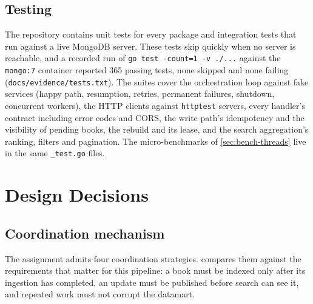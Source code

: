 \documentclass[10pt,a4paper]{article}
\newcommand{\code}[1]{\texttt{#1}}
\begin{document}
\subsection{Testing}
\label{sec:testing}

The repository contains unit tests for every package and integration tests that
run against a live MongoDB server. These tests skip quickly when no server is
reachable, and a recorded run of \code{go test -count=1 -v ./...} against the
\code{mongo:7} container reported 365 passing tests, none skipped and none
failing (\code{docs/evidence/\allowbreak tests.txt}). The suites cover the orchestration loop
against fake services (happy path, resumption, retries, permanent failures,
shutdown, concurrent workers), the HTTP clients against \code{httptest}
servers, every handler's contract including error codes and CORS, the write
path's idempotency and the visibility of pending books, the rebuild and its
lease, and the search aggregation's ranking, filters and pagination. The
micro-benchmarks of \cref{sec:bench-threads} live in the same
\code{\_test.go} files.
\section{Design Decisions}
\label{sec:design}

\subsection{Coordination mechanism}
\label{sec:decision-coordination}

The assignment admits four coordination strategies. 
compares them against the requirements that matter for this pipeline: a book
must be indexed only after its ingestion has completed, an update must be
published before search can see it, and repeated work must not corrupt the
datamart.
\end{document}
